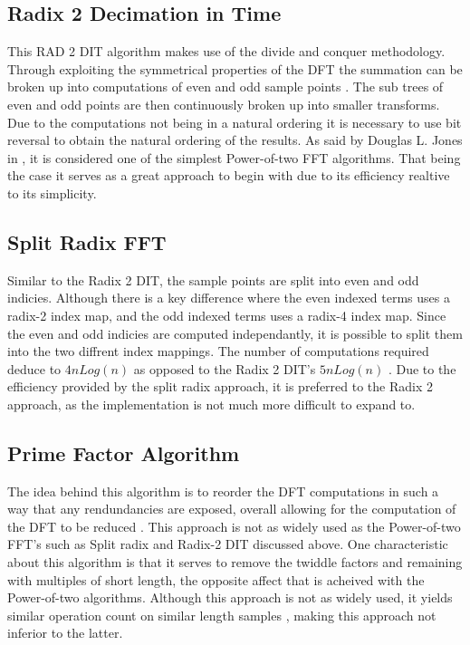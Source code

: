 \documentclass[journal]{IEEEtran}
\begin{document}
	\subsection{Radix 2 Decimation in Time}
		\par{
			This RAD 2 DIT algorithm makes use of the divide and conquer methodology. Through exploiting 
			the symmetrical properties of the DFT the summation can be broken up into computations of even 
			and odd sample points \cite{Soni}. The sub trees of even and odd points are then continuously 
			broken up into smaller transforms. Due to the computations not being in a natural ordering 
			it is necessary to use bit reversal to obtain the natural ordering of the results. As said by 
			Douglas L. Jones in \cite{Cnx}, it is considered one of the simplest Power-of-two FFT algorithms. 
			That being the case it serves as a great approach to begin with due to its efficiency realtive to 
			its simplicity.
		}
	\subsection{Split Radix FFT}
		\par{
			Similar to the Radix 2 DIT, the sample points are split into even and odd indicies. Although there is 
			a key difference where the even indexed terms uses a radix-2 index map, and the odd indexed terms uses 
			a radix-4 index map. Since the even and odd indicies are computed independantly, it is possible to split 
			them into the two diffrent index mappings. The number of computations required deduce to ${4n Log(n)}$ 
			as opposed to the Radix 2 DIT's ${5n Log(n)}$ \cite{Soni}. Due to the efficiency provided by the split 
			radix approach, it is preferred to the Radix 2 approach, as the implementation is not much more difficult 
			to expand to.
		}

	\subsection{Prime Factor Algorithm}
		\par{
			The idea behind this algorithm is to reorder the DFT computations in such a way that any rendundancies 
			are exposed, overall allowing for the computation of the DFT to be reduced \cite{Cnx}. 
			This approach is not as widely used as the Power-of-two FFT's such as Split radix and Radix-2 DIT discussed above. 
			One characteristic about this algorithm is that it serves to remove the twiddle factors and remaining with multiples 
			of short length, the opposite affect that is acheived with the Power-of-two algorithms. Although this approach is not 
			as widely used, it yields similar operation count on similar length samples \cite{Cnx}, making this approach not 
			inferior to the latter.
		}
\end{document}
